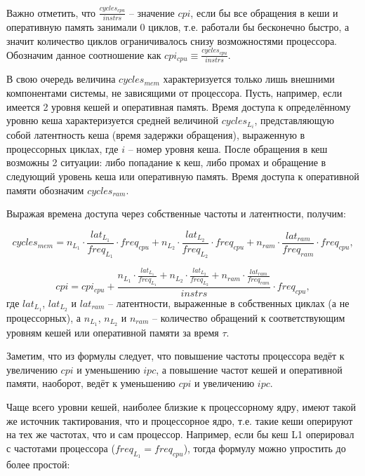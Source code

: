     Важно отметить, что $\frac{cycles_{cpu}}{instrs}$ -- значение $cpi$, если бы все обращения
    в кеши и оперативную память занимали 0 циклов, т.е. работали бы бесконечно быстро, а значит
    количество циклов ограничивалось снизу возможностями процессора. Обозначим данное соотношение
    как $cpi_{cpu} \equiv \frac{cycles_{cpu}}{instrs}$.

    В свою очередь величина $cycles_{mem}$ характеризуется только лишь внешними компонентами системы,
    не зависящими от процессора. Пусть, например, если имеется 2 уровня кешей и оперативная память.
    Время доступа к определённому уровню кеша характеризуется средней величиной $cycles_{L_{i}}$,
    представляющую собой латентность кеша (время задержки обращения), выраженную в процессорных
    циклах, где $i$ -- номер уровня кеша.
    После обращения в кеш возможны 2 ситуации: либо попадание к кеш, либо промах и обращение в
    следующий уровень кеша или оперативную память.
    Время доступа к оперативной памяти обозначим $cycles_{ram}$.

    Выражая времена доступа через собственные частоты и латентности, получим:

    \begin{equation}
        cycles_{mem} = n_{L_1} \cdot \frac{lat_{L_1}}{freq_{L_1}} \cdot freq_{cpu} +
        n_{L_2} \cdot \frac{lat_{L_2}}{freq_{L_2}} \cdot freq_{cpu} +
        n_{ram} \cdot \frac{lat_{ram}}{freq_{ram}} \cdot freq_{cpu},
    \end{equation}

    \begin{equation}
        cpi = cpi_{cpu} + \frac{n_{L_1} \cdot \frac{lat_{L_1}}{freq_{L_1}} +
        n_{L_2} \cdot \frac{lat_{L_2}}{freq_{L_2}} +
        n_{ram} \cdot \frac{lat_{ram}}{freq_{ram}}}{instrs} \cdot freq_{cpu},
    \end{equation}
    где $lat_{L_1}$, $lat_{L_2}$ и $lat_{ram}$ -- латентности, выраженные в собственных циклах
    (а не процессорных), а $n_{L_1}$, $n_{L_2}$ и $n_{ram}$ -- количество обращений к
    соответствующим уровням кешей или оперативной памяти за время $\tau$.

    Заметим, что из формулы следует, что повышение частоты процессора ведёт к увеличению $cpi$
    и уменьшению $ipc$, а повышение частот кешей и оперативной памяти, наоборот, ведёт к
    уменьшению $cpi$ и увеличению $ipc$.

    Чаще всего уровни кешей, наиболее близкие к процессорному ядру, имеют такой же источник
    тактирования, что и процессорное ядро, т.е. такие кеши оперируют на тех же частотах, что и
    сам процессор. Например, если бы кеш L1 оперировал с частотами процессора
    ($freq_{L_1} = freq_{cpu}$), тогда формулу можно упростить до более простой:

